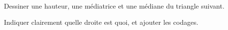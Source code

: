 
\begin{exercice}\label{exo2smath-0007}

    Dessiner une hauteur, une médiatrice et une médiane du triangle suivant.

\begin{center}
   
\end{center}

    Indiquer clairement quelle droite est quoi, et ajouter les codages.

\end{exercice}
